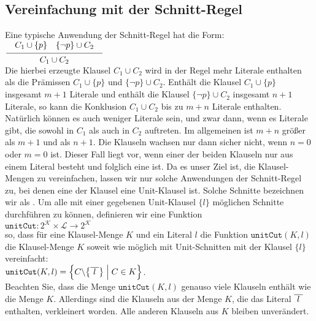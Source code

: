 \subsection{Vereinfachung mit der Schnitt-Regel}
Eine typische Anwendung der Schnitt-Regel hat die Form: \\[0.2cm]
\hspace*{1.3cm} $\schluss{ C_1 \cup \{p\} \quad \{\neg p\} \cup C_2}{C_1 \cup C_2}$
\\[0.2cm]
Die hierbei erzeugte Klausel $C_1 \cup C_2$ wird in der Regel mehr Literale enthalten
als die Prämissen $C_1 \cup \{p\}$ und $\bigl\{\neg p\} \cup C_2$.  Enthält die
Klausel $C_1 \cup \{p\}$ insgesamt $m+1$ Literale und enthält die Klausel
$\bigl\{\neg p\} \cup C_2$ insgesamt $n+1$ Literale, so kann die Konklusion $C_1 \cup C_2$ 
bis zu $m + n$ Literale enthalten.  Natürlich können es auch weniger Literale 
sein, und zwar dann, wenn es Literale gibt, die sowohl in $C_1$ als auch in $C_2$
auftreten.  Im allgemeinen ist $m + n$ größer als $m + 1$ und als $n + 1$.  Die
Klauseln wachsen nur dann sicher nicht, wenn  $n = 0$ oder $m = 0$ ist.
Dieser Fall liegt vor, wenn einer der beiden Klauseln nur aus einem Literal besteht
und folglich eine  ist.  Da es unser Ziel ist, die Klausel-Mengen
zu vereinfachen, lassen wir nur solche Anwendungen der Schnitt-Regel zu, bei denen
eine der Klausel eine Unit-Klausel ist.  Solche Schnitte bezeichnen wir als
.  Um alle mit einer gegebenen Unit-Klausel $\{l\}$ möglichen Schnitte
durchführen zu können, definieren wir eine Funktion
\\[0.2cm]
\hspace*{1.3cm}
$\texttt{unitCut}: 2^\mathcal{K} \times \mathcal{L} \rightarrow 2^\mathcal{K}$
\\[0.2cm]
so, dass für eine Klausel-Menge $K$ und ein Literal $l$ die Funktion
$\texttt{unitCut}(K,l)$ die Klausel-Menge $K$ soweit wie möglich mit Unit-Schnitten mit der Klausel
$\{l\}$ vereinfacht:
\\[0.2cm]
\hspace*{1.3cm}
$\texttt{unitCut}(K,l) = \Bigl\{ C \backslash \bigl\{ \overline{\,\,l\,\,} \bigr\} \;\Big|\; C \in K \Bigr\}$.
\\[0.2cm]
Beachten Sie, dass die Menge $\texttt{unitCut}(K,l)$ genauso viele Klauseln enthält wie die Menge
$K$.  Allerdings sind die Klauseln aus der Menge $K$, die das Literal $\overline{\,\,l\,\,}$
enthalten, verkleinert worden.   Alle anderen Klauseln aus $K$ bleiben unverändert.

